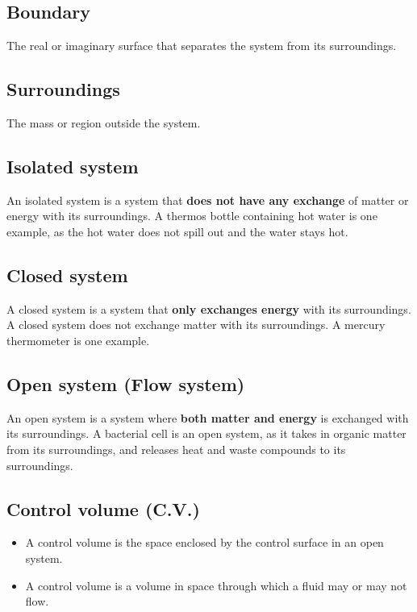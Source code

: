 \documentclass[11pt]{article}
\begin{document}
\subsection{Boundary}
\label{sec:org10f3549}
The real or imaginary surface that separates the system from its surroundings.

\subsection{Surroundings}
\label{sec:orgf08b728}
The mass or region outside the system.

\subsection{Isolated system}
\label{sec:orgdbad8e8}
An isolated system is a system that \textbf{does not have any exchange} of matter or energy with its surroundings. A thermos bottle containing hot water is one example, as the hot water does not spill out and the water stays hot.

\subsection{Closed system}
\label{sec:orge0005b7}
A closed system is a system that \textbf{only exchanges energy} with its surroundings. A closed system does not exchange matter with its surroundings. A mercury thermometer is one example.

\subsection{Open system (Flow system)}
\label{sec:orge7cf891}
An open system is a system where \textbf{both matter and energy} is exchanged with its surroundings. A bacterial cell is an open system, as it takes in organic matter from its surroundings, and releases heat and waste compounds to its surroundings.

\subsection{Control volume (C.V.)}
\label{sec:org7164140}
\begin{itemize}
\item A control volume is the space enclosed by the control surface in an open system.
\item A control volume is a volume in space through which a fluid may or may not flow.
\end{itemize}
\end{document}

